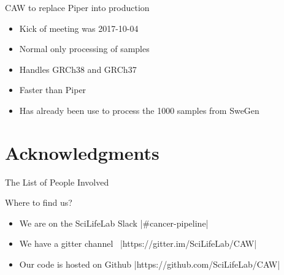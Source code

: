 \documentclass{beamer}
\begin{document}
\begin{frame}{CAW to replace Piper into production}
	\begin{center}
	\end{center}
	\begin{itemize}
		\item Kick of meeting was 2017-10-04
		\pause
		\item Normal only processing of samples
		\pause
		\item Handles GRCh38 and GRCh37
		\pause
		\item Faster than Piper
		\pause
		\item Has already been use to process the 1000 samples from SweGen
	\end{itemize}
\end{frame}

\section{Acknowledgments}

\begin{frame}{The List of People Involved}
	\begin{table}
	\end{table}
\end{frame}

\begin{frame}[fragile]{Where to find us?}
	\begin{itemize}
		\item We are on the SciLifeLab Slack
		\faSlack {}|#cancer-pipeline|
		\pause
		\item We have a gitter channel
		\ |https://gitter.im/SciLifeLab/CAW|
		\pause
		\item Our code is hosted on Github
		\faGithub {}|https://github.com/SciLifeLab/CAW|
	\end{itemize}
\end{frame}
\end{document}
